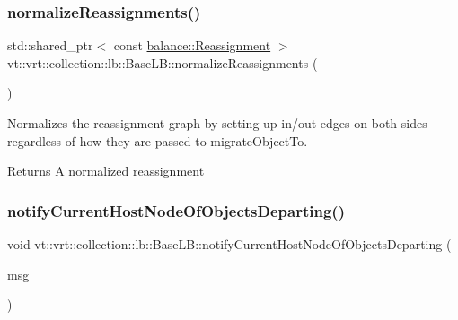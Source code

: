 \subsubsection{\texorpdfstring{normalize\+Reassignments()}{normalizeReassignments()}}
{\footnotesize\ttfamily std\+::shared\+\_\+ptr$<$ const \hyperlink{structvt_1_1vrt_1_1collection_1_1balance_1_1_reassignment}{balance\+::\+Reassignment} $>$ vt\+::vrt\+::collection\+::lb\+::\+Base\+L\+B\+::normalize\+Reassignments (\begin{DoxyParamCaption}{ }\end{DoxyParamCaption})\hspace{0.3cm}{\ttfamily [protected]}}



Normalizes the reassignment graph by setting up in/out edges on both sides regardless of how they are passed to {\ttfamily migrate\+Object\+To}. 

\begin{DoxyReturn}{Returns}
A normalized reassignment 
\end{DoxyReturn}
\mbox{\label{structvt_1_1vrt_1_1collection_1_1lb_1_1_base_l_b_a0f3cd0272069ff5fb31d6539c567efeb}} 
\subsubsection{\texorpdfstring{notify\+Current\+Host\+Node\+Of\+Objects\+Departing()}{notifyCurrentHostNodeOfObjectsDeparting()}}
{\footnotesize\ttfamily void vt\+::vrt\+::collection\+::lb\+::\+Base\+L\+B\+::notify\+Current\+Host\+Node\+Of\+Objects\+Departing (\begin{DoxyParamCaption}\item[{\hyperlink{structvt_1_1vrt_1_1collection_1_1lb_1_1_transfer_msg}{Transfer\+Msg}$<$ \hyperlink{structvt_1_1vrt_1_1collection_1_1lb_1_1_base_l_b_ad50ba1022c6beeb6e9187a8f1a3e16fe}{Obj\+Destination\+List\+Type} $>$ $\ast$}]{msg }\end{DoxyParamCaption})}

\mbox{\label{structvt_1_1vrt_1_1collection_1_1lb_1_1_base_l_b_a2bab9ccb4d2378b3915b03c79d5b18c2}} 

